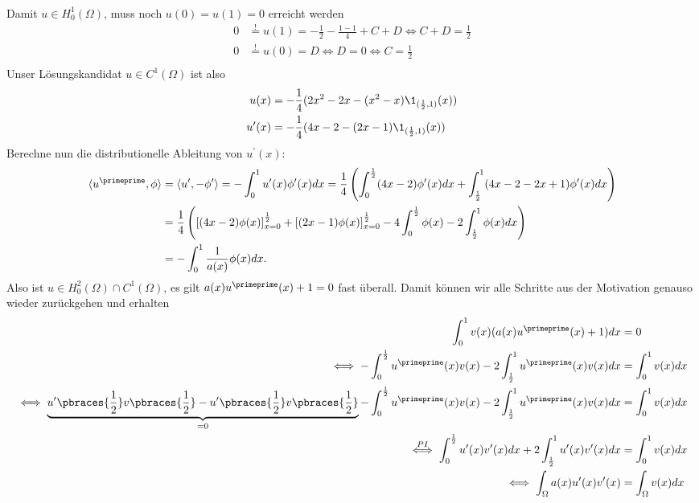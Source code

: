 \begin{solution}
\begin{align*}
\end{align*}
Damit $u \in H_0^1(\Omega)$, muss noch $u(0) = u(1) = 0$ erreicht werden
\begin{align*}
  0 &\stackrel{!}{=} u(1) = -\frac{1}{2} - \frac{1-1}{4} + C + D \iff C + D = \frac{1}{2} \\
  0 &\stackrel{!}{=} u(0) = D \iff D = 0 \iff C = \frac{1}{2} \\
\end{align*}
Unser Lösungskandidat $u \in C^1(\Omega)$ ist also
\begin{align*}
  u(x) &= -\frac{1}{4}(2x^2-2x- (x^2-x)\1_{(\frac{1}{2},1)}(x)) \\
  u^{\prime}(x) &= -\frac{1}{4}(4x -2 - (2x-1)\1_{(\frac{1}{2},1)}(x))
\end{align*}
Berechne nun die distributionelle Ableitung von $u^{\prime}(x)$:
\begin{align*}
  \langle u^{\primeprime}, \phi \rangle &= \langle u^{\prime}, -\phi^{\prime}\rangle
  = -\int_0^1 u^{\prime}(x)\phi^{\prime}(x) dx = \frac{1}{4}\left(\int_0^{\frac{1}{2}}(4x-2)\phi^{\prime}(x) dx +
  \int_{\frac{1}{2}}^1(4x-2-2x+1)\phi^{\prime}(x) dx\right) \\
  &= \frac{1}{4}\left([(4x-2)\phi(x)]_{x=0}^{\frac{1}{2}} + [(2x-1)\phi(x)]_{x=0}^{\frac{1}{2}} -
  4\int_0^{\frac{1}{2}}\phi(x) - 2\int_{\frac{1}{2}}^1\phi(x)dx\right) \\
  &= -\int_0^1 \frac{1}{a(x)}\phi(x) dx.
\end{align*}
Also ist $u \in H_0^2(\Omega) \cap C^1(\Omega)$, es gilt $a(x)u^{\primeprime}(x) + 1 = 0$
fast überall. Damit können wir alle Schritte aus der Motivation genauso wieder
zurückgehen und erhalten
\begin{align*}
  \int_0^1 v(x)(a(x)u^{\primeprime}(x) + 1) dx &= 0 \\
  \iff - \int_0^{\frac{1}{2}}u^{\primeprime}(x)v(x) -2\int_{\frac{1}{2}}^1 u^{\primeprime}(x)v(x) dx
  &= \int_0^1 v(x) dx \\
   \iff \underbrace{u^{\prime}\pbraces{\frac{1}{2}}v\pbraces{\frac{1}{2}} - u^{\prime}\pbraces{\frac{1}{2}}v\pbraces{\frac{1}{2}}}_{=0} - \int_0^{\frac{1}{2}}u^{\primeprime}(x)v(x)
  -2 \int_{\frac{1}{2}}^1 u^{\primeprime}(x)v(x) dx  &=
  \int_0^1 v(x) dx \\
  \stackrel{PI}{\iff} \int_0^{\frac{1}{2}} u^{\prime}(x)v^{\prime}(x)dx +
  2\int_{\frac{1}{2}}^1 u^{\prime}(x)v^{\prime}(x) dx &= \int_0^1 v(x) dx \\
  \iff \int_\Omega a(x)u^{\prime}(x)v^{\prime}(x) &= \int_\Omega v(x) dx
\end{align*}
\end{solution}

